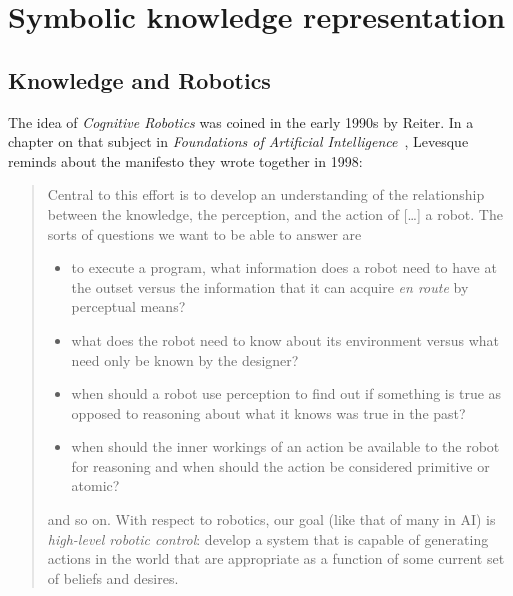 \chapter{Symbolic knowledge representation}
\label{chapt|krs}


\section{Knowledge and Robotics}
\label{sect|knowledge}

The idea of \emph{Cognitive Robotics} was coined in the early 1990s by Reiter.
In a chapter on that subject in \emph{Foundations of Artificial
Intelligence}~\cite{Levesque2008}, Levesque reminds about the manifesto they
wrote together in 1998:

\begin{quotation}

    Central to this effort is to develop an understanding of the relationship
    between the knowledge, the perception, and the action of [\ldots] a robot. The
    sorts of questions we want to be able to answer are

    \begin{itemize} 

        \item to execute a program, what information does a robot need to have
        at the outset versus the information that it can acquire \emph{en route}
        by perceptual means?

        \item what does the robot need to know about its environment versus what
        need only be known by the designer?

        \item when should a robot use perception to find out if something is
        true as opposed to reasoning about what it knows was true in the past?

        \item when should the inner workings of an action be available to the
        robot for reasoning and when should the action be considered primitive
        or atomic?

    \end{itemize}

    and so on. With respect to robotics, our goal (like that of many in AI) is
    \emph{high-level robotic control}: develop a system that is capable of
    generating actions in the world that are appropriate as a function of some
    current set of beliefs and desires.

\end{quotation}

